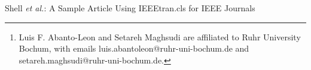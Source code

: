 \documentclass[10pt,journal,compsoc]{IEEEtran}
\theoremstyle{myremark}
\theoremstyle{myexample}
\begin{document}






\author{Luis F. Abanto-Leon and Setareh Maghsudi
\thanks{Luis F. Abanto-Leon and Setareh Maghsudi are affiliated to Ruhr University Bochum, with emails luis.abantoleon@ruhr-uni-bochum.de and setareh.maghsudi@ruhr-uni-bochum.de.}%
}

 


%
{Shell \MakeLowercase{\textit{et al.}}: A Sample Article Using IEEEtran.cls for IEEE Journals}


\maketitle


\end{document}
